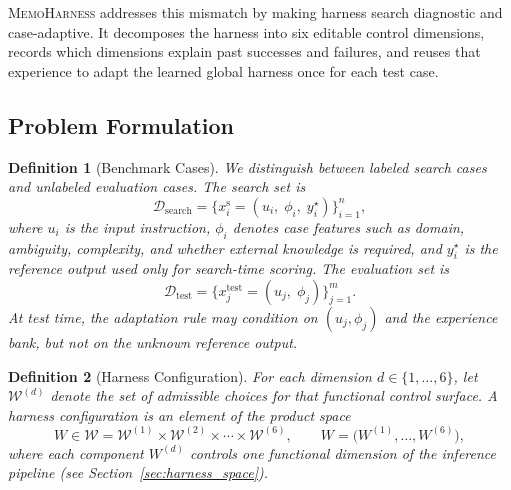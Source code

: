 \documentclass{article}
\newcommand{\method}{\textsc{MemoHarness}\xspace}
\newtheorem{definition}{Definition}[section]
\begin{document}
\method addresses this mismatch by making harness search diagnostic and
case-adaptive. It decomposes the harness into six editable control dimensions,
records which dimensions explain past successes and failures, and reuses that
experience to adapt the learned global harness once for each test case.

\subsection{Problem Formulation}
\label{sec:formulation}

\begin{definition}[Benchmark Cases]
\label{def:case}
We distinguish between labeled search cases and unlabeled evaluation cases.
The search set is
\begin{equation}
\label{eq:search_set}
\mathcal{D}_{\mathrm{search}}
=
\bigl\{x_i^{\mathrm{s}}=(u_i,\; \phi_i,\; y_i^\star)\bigr\}_{i=1}^{n},
\end{equation}
where $u_i$ is the input instruction, $\phi_i$ denotes case features such as
domain, ambiguity, complexity, and whether external knowledge is required, and
$y_i^\star$ is the reference output used only for search-time scoring. The
evaluation set is
\begin{equation}
\label{eq:test_set}
\mathcal{D}_{\mathrm{test}}
=
\bigl\{x_j^{\mathrm{test}}=(u_j,\; \phi_j)\bigr\}_{j=1}^{m}.
\end{equation}
At test time, the adaptation rule may condition on $(u_j,\phi_j)$ and the
experience bank, but not on the unknown reference output.
\end{definition}

\begin{definition}[Harness Configuration]
\label{def:harness}
For each dimension $d \in \{1,\ldots,6\}$, let $\mathcal{W}^{(d)}$ denote the
set of admissible choices for that functional control surface. A harness
configuration is an element of the product space
\begin{equation}
\label{eq:harness}
W \in \mathcal{W}
=
\mathcal{W}^{(1)}
\times
\mathcal{W}^{(2)}
\times
\cdots
\times
\mathcal{W}^{(6)},
\qquad
W = \bigl(W^{(1)},\ldots,W^{(6)}\bigr),
\end{equation}
where each component $W^{(d)}$ controls one functional dimension of the
inference pipeline (see Section~\ref{sec:harness_space}).
\end{definition}
\end{document}

